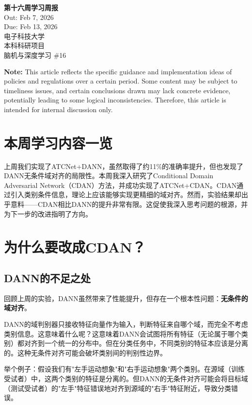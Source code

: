 \documentclass[12pt,a4paper]{ctexart}
\begin{document}
\begin{center}
    {\LARGE \textbf{第十六周学习周报}}\\[0.5cm]
    {\large Out: Feb 7, 2026}\\
    {\large Due: Feb 13, 2026}\\[0.5cm]
    {\large 电子科技大学}\\
    {\large 本科科研项目}\\
    {\large 脑机与深度学习 \#16}
\end{center}

\vspace{1cm}

\noindent \textbf{Note:} This article reflects the specific guidance and implementation ideas of policies and regulations over a certain period. Some content may be subject to timeliness issues, and certain conclusions drawn may lack concrete evidence, potentially leading to some logical inconsistencies. Therefore, this article is intended for internal discussion only.

\section{本周学习内容一览}

上周我们实现了ATCNet+DANN，虽然取得了约11\%的准确率提升，但也发现了DANN无条件域对齐的局限性。本周我深入研究了Conditional Domain Adversarial Network（CDAN）方法，并成功实现了ATCNet+CDAN。CDAN通过引入类别条件信息，理论上应该能够实现更精细的域对齐。然而，实验结果却出乎意料——CDAN相比DANN的提升非常有限。这促使我深入思考问题的根源，并为下一步的改进指明了方向。

\section{为什么要改成CDAN？}

\subsection{DANN的不足之处}

回顾上周的实验，DANN虽然带来了性能提升，但存在一个根本性问题：\textbf{无条件的域对齐}。

DANN的域判别器只接收特征向量作为输入，判断特征来自哪个域，而完全不考虑类别信息。这意味着什么呢？这意味着DANN会试图将所有特征（无论属于哪个类别）都对齐到一个统一的分布中。但在分类任务中，不同类别的特征本应该是分离的。这种无条件对齐可能会破坏类别间的判别性边界。

举个例子：假设我们有"左手运动想象"和"右手运动想象"两个类别。在源域（训练受试者）中，这两个类别的特征是分离的。但DANN的无条件对齐可能会将目标域（测试受试者）的"左手"特征错误地对齐到源域的"右手"特征附近，导致分类错误。
\end{document}
